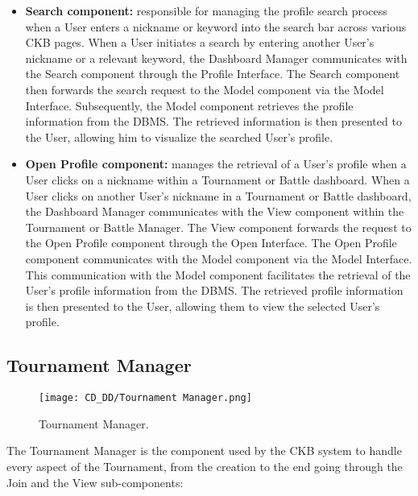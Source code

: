 \begin{itemize}
    \item \textbf{Search component:} responsible for managing the profile search process when a User enters a nickname or keyword into the search bar across various CKB pages. When a User initiates a search by entering another User's nickname or a relevant keyword, the Dashboard Manager communicates with the Search component through the Profile Interface. The Search component then forwards the search request to the Model component via the Model Interface. Subsequently, the Model component retrieves the profile information from the DBMS. The retrieved information is then presented to the User, allowing him to visualize the searched User's profile.
    \item \textbf{Open Profile component:} manages the retrieval of a User's profile when a User clicks on a nickname within a Tournament or Battle dashboard. When a User clicks on another User's nickname in a Tournament or Battle dashboard, the Dashboard Manager communicates with the View component within the Tournament or Battle Manager. The View component forwards the request to the Open Profile component through the Open Interface. The Open Profile component communicates with the Model component via the Model Interface. This communication with the Model component facilitates the retrieval of the User's profile information from the DBMS. The retrieved profile information is then presented to the User, allowing them to view the selected User's profile.
\end{itemize}

\subsection{Tournament Manager}
\label{subsec:tournament_manager}%

\begin{figure}[H]
    \begin{center}
        \texttt{[image: CD\_DD/Tournament Manager.png]}
        \caption{Tournament Manager.}
        \label{fig:tournament_manager}%
    \end{center}
\end{figure}

\noindent The Tournament Manager is the component used by the CKB system to handle every aspect of the Tournament, from the creation to the end going through the Join and the View sub-components:

